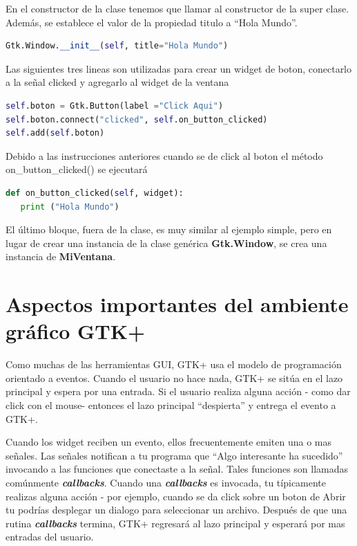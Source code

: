 \documentclass[12pt, twoside]{report}
\begin{document}
En el constructor de la clase tenemos que llamar al constructor de la super clase. Además, se establece el valor de la propiedad titulo a ``Hola Mundo''.

\begin{lstlisting}[language=Python]
Gtk.Window.__init__(self, title="Hola Mundo")
\end{lstlisting}

Las siguientes tres lineas son utilizadas para crear un widget de boton, conectarlo a la señal clicked y agregarlo al widget de la ventana


\begin{lstlisting}[language=Python]
self.boton = Gtk.Button(label ="Click Aqui")
self.boton.connect("clicked", self.on_button_clicked)
self.add(self.boton)
\end{lstlisting}

Debido a las instrucciones anteriores cuando se de click al boton el método on\_button\_clicked() se ejecutará

\begin{lstlisting}[language=Python]
def on_button_clicked(self, widget):
   print ("Hola Mundo")
\end{lstlisting}

 El último bloque, fuera de la clase, es muy similar al ejemplo simple, pero en lugar de crear una instancia de la clase genérica \textbf{Gtk.Window}, se crea una instancia de \textbf{MiVentana}.

\section{Aspectos importantes del ambiente gráfico GTK+}


Como muchas de las herramientas GUI, GTK+ usa el modelo de programación orientado a eventos. Cuando el usuario no hace nada, GTK+ se sitúa en el lazo principal y espera por una entrada. Si el usuario realiza alguna acción - como dar click con el mouse- entonces el lazo principal ``despierta'' y entrega el evento a GTK+.


Cuando los widget reciben un evento, ellos frecuentemente emiten una o mas señales. Las señales notifican a tu programa que ``Algo interesante ha sucedido'' invocando a las funciones que conectaste a la señal. Tales funciones son llamadas comúnmente \textit{\textbf{callbacks}}. Cuando una \textit{\textbf{callbacks}} es invocada, tu típicamente realizas alguna acción - por ejemplo, cuando se da click sobre un boton de Abrir tu podrías desplegar un dialogo para seleccionar un archivo. Después  de que una rutina \textit{\textbf{callbacks}} termina, GTK+ regresará al lazo principal y esperará por mas entradas del usuario.
\end{document}
